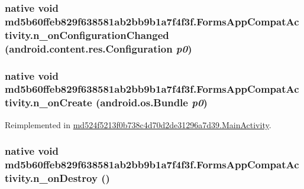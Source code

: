 \hypertarget{classmd5b60ffeb829f638581ab2bb9b1a7f4f3f_1_1_forms_app_compat_activity_ac0346e9a23dc8d135e4c489d5890812}{
\subsubsection[{n\_\-onConfigurationChanged}]{\setlength{\rightskip}{0pt plus 5cm}native void md5b60ffeb829f638581ab2bb9b1a7f4f3f.FormsAppCompatActivity.n\_\-onConfigurationChanged (android.content.res.Configuration {\em p0})}}
\label{classmd5b60ffeb829f638581ab2bb9b1a7f4f3f_1_1_forms_app_compat_activity_ac0346e9a23dc8d135e4c489d5890812}


\hypertarget{classmd5b60ffeb829f638581ab2bb9b1a7f4f3f_1_1_forms_app_compat_activity_6bc254edf45b4b316595aac2cc544b5e}{
\subsubsection[{n\_\-onCreate}]{\setlength{\rightskip}{0pt plus 5cm}native void md5b60ffeb829f638581ab2bb9b1a7f4f3f.FormsAppCompatActivity.n\_\-onCreate (android.os.Bundle {\em p0})}}
\label{classmd5b60ffeb829f638581ab2bb9b1a7f4f3f_1_1_forms_app_compat_activity_6bc254edf45b4b316595aac2cc544b5e}




Reimplemented in \hyperlink{classmd524f5213f0b738c4d70d2de31296a7d39_1_1_main_activity_9dfe7db08412a7c918b87ddeac611a44}{md524f5213f0b738c4d70d2de31296a7d39.MainActivity}.\hypertarget{classmd5b60ffeb829f638581ab2bb9b1a7f4f3f_1_1_forms_app_compat_activity_e84d5e15e2d7b9edda7ccf8e486346e8}{
\subsubsection[{n\_\-onDestroy}]{\setlength{\rightskip}{0pt plus 5cm}native void md5b60ffeb829f638581ab2bb9b1a7f4f3f.FormsAppCompatActivity.n\_\-onDestroy ()}}
\label{classmd5b60ffeb829f638581ab2bb9b1a7f4f3f_1_1_forms_app_compat_activity_e84d5e15e2d7b9edda7ccf8e486346e8}


